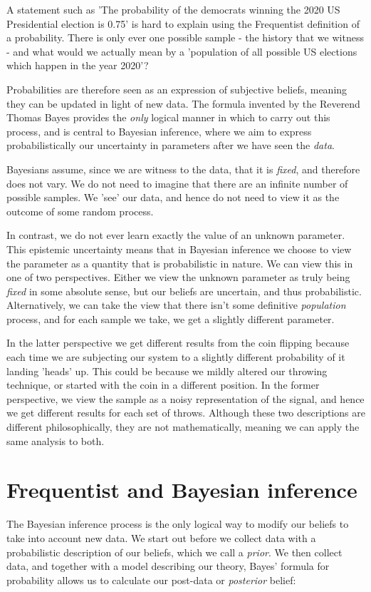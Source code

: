 \documentclass[11pt,fullpage]{book}
\begin{document}
A statement such as 'The probability of the democrats winning the 2020 US Presidential election is 0.75' is hard to explain using the Frequentist definition of a probability. There is only ever one possible sample - the history that we witness - and what would we actually mean by a 'population of all possible US elections which happen in the year 2020'? 

Probabilities are therefore seen as an expression of subjective beliefs, meaning they can be updated in light of new data. The formula invented by the Reverend Thomas Bayes provides the \textit{only} logical manner in which to carry out this process, and is central to Bayesian inference, where we aim to express probabilistically our uncertainty in parameters after we have seen the \textit{data}. 

Bayesians assume, since we are witness to the data, that it is \textit{fixed}, and therefore does not vary. We do not need to imagine that there are an infinite number of possible samples. We 'see' our data, and hence do not need to view it as the outcome of some random process.

In contrast, we do not ever learn exactly the value of an unknown parameter. This epistemic uncertainty means that in Bayesian inference we choose to view the parameter as a quantity that is probabilistic in nature. We can view this in one of two perspectives. Either we view the unknown parameter as truly being \textit{fixed} in some absolute sense, but our beliefs are uncertain, and thus probabilistic. Alternatively, we can take the view that there isn't some definitive \textit{population} process, and for each sample we take, we get a slightly different parameter.

In the latter perspective we get different results from the coin flipping because each time we are subjecting our system to a slightly different probability of it landing 'heads' up. This could be because we mildly altered our throwing technique, or started with the coin in a different position. In the former perspective, we view the sample as a noisy representation of the signal, and hence we get different results for each set of throws. Although these two descriptions are different philosophically, they are not mathematically, meaning we can apply the same analysis to both.

\section{Frequentist and Bayesian inference}
The Bayesian inference process is the only logical way to modify our beliefs to take into account new data. We start out before we collect data with a probabilistic description of our beliefs, which we call a \textit{prior}. We then collect data, and together with a model describing our theory, Bayes' formula for probability allows us to calculate our post-data or \textit{posterior} belief:
\end{document}
